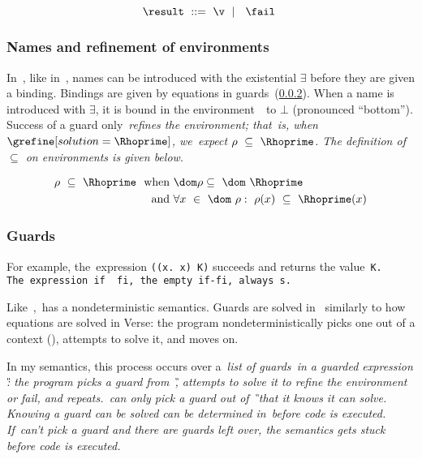 \documentclass[manuscript,screen 12pt, nonacm]{acmart}
\begin{document}
    \[\result\;~\rm{::=}\;~\v\;~\vert~\;~\fail~\]
    

    \subsubsection{Names and refinement of environments}

    In~\VMinus, like in~\VC, names can be introduced with the existential
    {$\exists$} before they are given a binding. Bindings are given by equations
    in guards~(\ref{guards}). When a name is introduced with {$\exists$}, it is
    bound in the environment~\Rho\ to $\bot$ (pronounced “bottom”). Success of a
    guard only~\it{refines} the environment; that~is, when
    $\grefine[solution=\Rhoprime]$, we~expect $\rho~\subseteq~\Rhoprime$. The
    definition of $\subseteq$ on environments is given below. 
    
    \begin{align*}
    \rho~\subseteq~\Rhoprime~\text{ when }&\dom\rho  \subseteq~\dom~\Rhoprime\\
    \text{ and } &\forall x~\in~\dom~\rho:~\rho(x)~\subseteq~\Rhoprime(x)
    \end{align*}
    
    \smallskip
        
    \subsubsection{Guards}
    \label{guards}

    For example, the~\VMinus expression {\tt{((}\ttbackslash\tt{x. x) K)}}
    succeeds and returns the value~\tt{K}. The~\VMinus expression~\tt{if~~fi},
    the empty~\tt{if-fi}, always {\fail}s. 

    Like~\VC,~\VMinus has a nondeterministic semantics. Guards are solved in~\VMinus
    similarly to how equations are solved in Verse: the program nondeterministically
    picks one out of a context (\context), attempts to solve it, and moves on. 

In my semantics, this process occurs over a~\it{list} of guards~\gs in a guarded
expression \G: the program picks a guard from~\G, attempts to solve it to refine
the environment or fail, and repeats.~\VMinus can only pick a guard out of \G\
that it \it{knows} it can solve. \it{Knowing} a guard can be solved can be determined
in~\VMinus before code is executed. If~\VMinus can't pick a guard and there are
guards left over, the semantics gets stuck before code is executed. 
\end{document}
